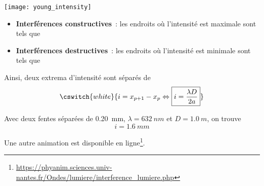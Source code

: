 \documentclass[../main/main.tex]{subfiles}
\begin{document}
\begin{center}
    \texttt{[image: young\_intensity]}
\end{center}

\begin{itemize}
    \item \textbf{Interférences constructives}~: les endroits où l'intensité est
        maximale sont tels que
        \vspace{-10pt}
    \item \textbf{Interférences destructives}~: les endroits où l'intensité est
        minimale sont tels que
        \vspace{-10pt}
\end{itemize}

Ainsi, deux extrema d'intensité sont séparés de
\[\cswitch{white}{
    i = x_{p+1} - x_p \Leftrightarrow \boxed{i = \frac{\lambda D}{2a}}
}\]

Avec deux fentes séparées de \SI{0.20}{mm}, $\lambda = \SI{632}{nm}$ et $D =
\SI{1.0}{m}$, on trouve
\[\boxed{i = \SI{1.6}{mm}}\]

Une autre animation est disponible en
ligne\footnote{\url{https://phyanim.sciences.univ-nantes.fr/Ondes/lumiere/interference_lumiere.php}}.
\end{document}
